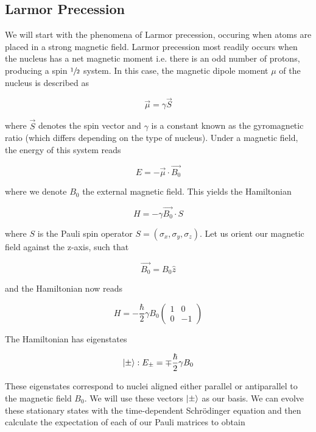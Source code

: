 \documentclass[
    floatfix,  %
    reprint,
    amsmath,amssymb,
    aps,
]{revtex4-2}
\DeclarePairedDelimiter\ket{\lvert}{\rangle}
\newcommand{\half}{$\sfrac{1}{2}$ }
\newcommand{\pauliz}{
    \begin{pmatrix}
        1 & 0 \\
        0 & -1
\end{pmatrix}}
\begin{document}
\subsection{\label{subsec:larmor} Larmor Precession}

We will start with the phenomena of Larmor precession, occuring when atoms are placed in a strong magnetic field. Larmor precession most readily occurs when the nucleus has a net magnetic moment i.e. there is an odd number of protons, producing a spin \half  system. In this case, the magnetic dipole moment $\mu$ of the nucleus is described as

\begin{equation}
    \vec{\mu} = \gamma \vec{S}
\end{equation}

where $\vec{S}$ denotes the spin vector and $\gamma$ is a constant known as the gyromagnetic ratio (which differs depending on the type of nucleus). Under a magnetic field, the energy of this system reads

\begin{equation}
    E = -\vec{\mu} \cdot \vec{B_0}
\end{equation}

where we denote $B_0$ the external magnetic field. This yields the Hamiltonian

\begin{equation}\label{eqn:base-hamiltonian}
    H = -\gamma \vec{B_0} \cdot S
\end{equation}

where $S$ is the Pauli spin operator $S = (\sigma_x, \sigma_y, \sigma_z)$. Let us orient our magnetic field against the z-axis, such that

\begin{equation}
    \vec{B_0} = B_0 \hat{z}
\end{equation}

and the Hamiltonian now reads

\begin{equation}\label{eqn:hamiltonian}
    H = -\frac{\hbar}{2} \gamma B_0  \pauliz
\end{equation}

The Hamiltonian has eigenstates

\begin{equation}
    \ket{\pm} : E_\pm = \mp \frac{\hbar}{2} \gamma B_0
\end{equation}

These eigenstates correspond to nuclei aligned either parallel or antiparallel to the magnetic field $B_0$. We will use these vectors $\ket{\pm}$ as our basis. We can evolve these stationary states with the time-dependent Schr\"odinger equation and then calculate the expectation of each of our Pauli matrices to obtain
\end{document}
